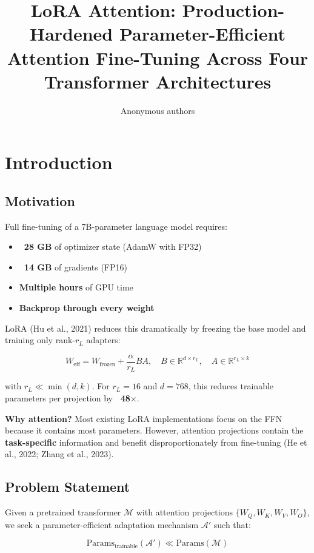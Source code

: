 \title{\textbf{LoRA Attention: Production-Hardened Parameter-Efficient Attention Fine-Tuning Across Four Transformer Architectures}}

\author{Anonymous authors}


\section{Introduction}

\subsection{Motivation}

Full fine-tuning of a 7B-parameter language model requires:
\begin{itemize}
\item \textbf{~28 GB} of optimizer state (AdamW with FP32)
\item \textbf{~14 GB} of gradients (FP16)
\item \textbf{Multiple hours} of GPU time
\item \textbf{Backprop through every weight}

\end{itemize}
LoRA (Hu et al., 2021) reduces this dramatically by freezing the base model 
and training only rank-$r_L$ adapters:

\[
W_\text{eff} = W_\text{frozen} + \frac{\alpha}{r_L} B A, \quad
B \in \mathbb{R}^{d \times r_L}, \quad A \in \mathbb{R}^{r_L \times k}
\tag{1.1}
\]

with $r_L \ll \min(d, k)$. For $r_L = 16$ and $d = 768$, this reduces 
trainable parameters per projection by \textbf{~48$\times$}.

\textbf{Why attention?} Most existing LoRA implementations focus on the FFN 
because it contains most parameters. However, attention projections contain 
the \textbf{task-specific} information and benefit disproportionately from 
fine-tuning (He et al., 2022; Zhang et al., 2023).

\subsection{Problem Statement}

Given a pretrained transformer $\mathcal{M}$ with attention projections 
$\{W_Q, W_K, W_V, W_O\}$, we seek a parameter-efficient adaptation mechanism 
$\mathcal{A}'$ such that:

\[
\text{Params}_\text{trainable}(\mathcal{A}') \ll \text{Params}(\mathcal{M})
\tag{1.2}
\]

